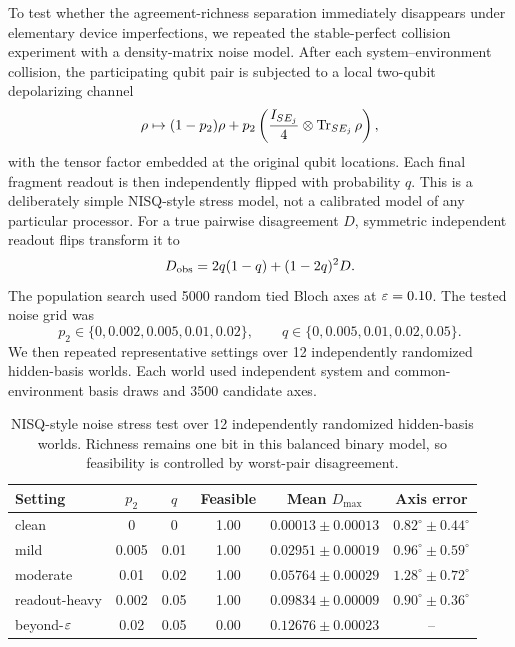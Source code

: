 To test whether the agreement-richness separation immediately disappears under elementary device imperfections, we repeated the stable-perfect collision experiment with a density-matrix noise model. After each system--environment collision, the participating qubit pair is subjected to a local two-qubit depolarizing channel
\begin{equation}
\rho\mapsto (1-p_2)\rho+p_2\left(\frac{I_{SE_j}}{4}\otimes\operatorname{Tr}_{SE_j}\rho\right),
\label{eq:depol}
\end{equation}
with the tensor factor embedded at the original qubit locations. Each final fragment readout is then independently flipped with probability $q$. This is a deliberately simple NISQ-style stress model, not a calibrated model of any particular processor. For a true pairwise disagreement $D$, symmetric independent readout flips transform it to
\begin{equation}
D_{\rm obs}=2q(1-q)+(1-2q)^2D.
\label{eq:readoutdis}
\end{equation}
The population search used 5000 random tied Bloch axes at $\varepsilon=0.10$. The tested noise grid was
\[
p_2\in\{0,0.002,0.005,0.01,0.02\},\qquad
q\in\{0,0.005,0.01,0.02,0.05\}.
\]
We then repeated representative settings over 12 independently randomized hidden-basis worlds. Each world used independent system and common-environment basis draws and 3500 candidate axes.

\begin{table}[H]
\centering
\caption{NISQ-style noise stress test over 12 independently randomized hidden-basis worlds. Richness remains one bit in this balanced binary model, so feasibility is controlled by worst-pair disagreement.}
\label{tab:noisy}
\begin{tabular}{lccccc}
\toprule
Setting & $p_2$ & $q$ & Feasible & Mean $D_{\max}$ & Axis error \\
\midrule
clean & 0 & 0 & 1.00 & $0.00013\pm0.00013$ & $0.82^\circ\pm0.44^\circ$\\
 mild & 0.005 & 0.01 & 1.00 & $0.02951\pm0.00019$ & $0.96^\circ\pm0.59^\circ$\\
 moderate & 0.01 & 0.02 & 1.00 & $0.05764\pm0.00029$ & $1.28^\circ\pm0.72^\circ$\\
 readout-heavy & 0.002 & 0.05 & 1.00 & $0.09834\pm0.00009$ & $0.90^\circ\pm0.36^\circ$\\
 beyond-$\varepsilon$ & 0.02 & 0.05 & 0.00 & $0.12676\pm0.00023$ & --\\
\bottomrule
\end{tabular}
\end{table}

